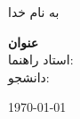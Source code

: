 \documentclass[main]{subfiles}
\begin{document}
\begin{center}
	
	به نام خدا
	
	\vspace{200pt}
	
	\fontsize{22pt}{18pt}
	\textbf{ عنوان}\\
	
	\vspace{60pt}
استاد راهنما:\\
	\vspace{20pt}
	دانشجو:
	\vspace{230pt}
	
	
	\fontsize{12pt}{14pt}
	\today
	\pagebreak
\end{center}
\end{document}
